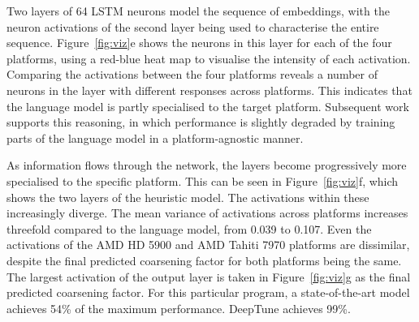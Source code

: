 Two layers of 64 LSTM neurons model the sequence of embeddings, with the neuron activations of the second layer being used to characterise the entire sequence. Figure~\ref{fig:viz}e shows the neurons in this layer for each of the four platforms, using a red-blue heat map to visualise the intensity of each activation. Comparing the activations between the four platforms reveals a number of neurons in the layer with different responses across platforms. This indicates that the language model is partly specialised to the target platform. Subsequent work~\cite{Ben-nun2018} supports this reasoning, in which performance is slightly degraded by training parts of the language model in a platform-agnostic manner.

As information flows through the network, the layers become progressively more specialised to the specific platform. This can be seen in Figure~\ref{fig:viz}f, which shows the two layers of the heuristic model. The activations within these increasingly diverge. The mean variance of activations across platforms increases threefold compared to the language model, from 0.039 to 0.107. Even the activations of the AMD HD 5900 and AMD Tahiti 7970 platforms are dissimilar, despite the final predicted coarsening factor for both platforms being the same. The largest activation of the output layer is taken in Figure~\ref{fig:viz}g as the final predicted coarsening factor. For this particular program, a state-of-the-art model achieves 54\% of the maximum performance. DeepTune achieves 99\%.
